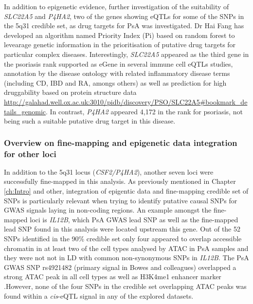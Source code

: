 
In addition to epigenetic evidence, further investigation of the suitability of \textit{SLC22A5} and \textit{P4HA2}, two of the genes showing eQTLs for some of the SNPs in the 5q31 credible set, as drug targets for PsA was investigated. Dr Hai Fang has developed an algorithm named Priority Index (Pi) based on random forest to levearage genetic information in the prioritisation of putative drug targets for particular complex diseases. Interestingly, \textit{SLC22A5} appeared as the third gene in the psoriasis rank supported as eGene in several immune cell eQTLs studies, annotation by the disease ontology with related inflammatory disease terms (including CD, IBD and RA, amongs others) as well as prediction for high druggability based on protein structure data \url{http://galahad.well.ox.ac.uk:3010/pidb/discovery/PSO/SLC22A5#bookmark_details_genomic}. In contrast, \textit{P4HA2} appeared 4,172 in the rank for psoriasis, not being such a suitable putative drug target in this disease. 

\subsubsection{Overview on fine-mapping and epigenetic data integration for other loci}
In addition to the 5q31 locus (\textit{CSF2/P4HA2}), another seven loci were successfully fine-mapped in this analysis. As previously mentioned in Chapter \ref{ch:Intro} and other, integration of epigentic data and fine-mapping credible set of SNPs is particularly relevant when trying to identify putative causal SNPs for GWAS signals laying in non-coding regions. An example amongst the fine-mapped loci is \textit{IL12B}, which PsA GWAS lead SNP as well as the fine-mapped lead SNP found in this analysis were located upstream this gene. Out of the 52 SNPs identified in the 90\% credible set only four appeared to overlap accessible chromatin in at least two of the cell types analysed by ATAC in PsA samples and they were not not in LD with common non-synonymous SNPs in \textit{IL12B}. The PsA GWAS SNP rs4921482 (primary signal in Bowes and colleagues) overlapped a strong ATAC peak in all cell types as well as H3K4me1 enhancer marker .However, none of the four SNPs in the credible set overlapping ATAC peaks was found within a \textit{cis}-eQTL signal in any of the explored datasets.

